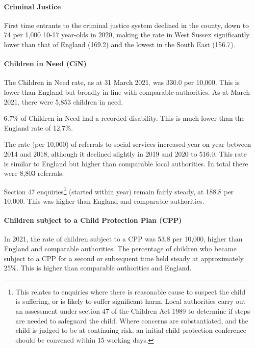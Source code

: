 \paragraph{Criminal Justice}

First time entrants to the criminal justice system declined in the county, down to 74 per 1,000 10-17 year-olds in 2020, making the rate in West Sussex significantly lower than that of England (169.2) and the lowest in the South East (156.7).

\paragraph{Children in Need (CiN)} The Children in Need rate, as at 31 March 2021, was 330.0 per 10,000. This is lower than England but broadly in line with comparable authorities. As at March 2021, there were 5,853 children in need.

6.7\% of Children in Need had a recorded disability. This is much lower than the England rate of 12.7\%.

The rate (per 10,000) of referrals to social services increased year on year between 2014 and 2018, although it declined slightly in 2019 and 2020 to 516.0. This rate is similar to England but higher than comparable local authorities. In total there were 8,803 referrals.

Section 47 enquiries\footnote{This relates to enquiries where there is reasonable cause to suspect the child is suffering, or is likely to suffer significant harm. Local authorities carry out an assessment under section 47 of the Children Act 1989 to determine if steps are needed to safeguard the child. Where concerns are substantiated, and the child is judged to be at continuing risk, an initial child protection conference should be convened within 15 working days.} (started within year) remain fairly steady, at 188.8 per 10,000. This was higher than England and comparable authorities.

\paragraph{Children subject to a Child Protection Plan (CPP)} In 2021, the rate of children subject to a CPP was 53.8 per 10,000, higher than England and comparable authorities. The percentage of children who became subject to a CPP for a second or subsequent time held steady at approximately 25\%. This is higher than comparable authorities and England.

